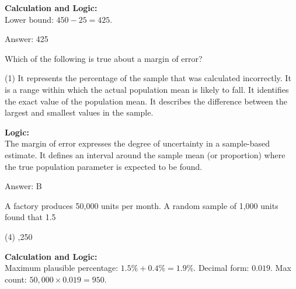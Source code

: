 \documentclass[11pt,paper=a4,answers]{exam}
\begin{document}
\begin{questions}
\begin{solution}
\textbf{Calculation and Logic:} \\
Lower bound: $450 - 25 = 425$.

\vspace{30pt}

Answer: \colorbox{yellow!100}{425}
\end{solution}

\vspace{60pt}

\question
Which of the following is true about a margin of error?
\begin{tasks}(1)
    \task It represents the percentage of the sample that was calculated incorrectly.
    \task It is a range within which the actual population mean is likely to fall.
    \task It identifies the exact value of the population mean.
    \task It describes the difference between the largest and smallest values in the sample.
\end{tasks}

\begin{solution}
\textbf{Logic:} \\
The margin of error expresses the degree of uncertainty in a sample-based estimate. It defines an interval around the sample mean (or proportion) where the true population parameter is expected to be found. 

\vspace{30pt}

Answer: \colorbox{yellow!100}{B}
\end{solution}

\vspace{60pt}

\question
A factory produces 50,000 units per month. A random sample of 1,000 units found that 1.5%
\begin{tasks}(4)
    ,250
\end{tasks}

\begin{solution}
\textbf{Calculation and Logic:} \\
Maximum plausible percentage: $1.5\% + 0.4\% = 1.9\%$. Decimal form: $0.019$. Max count: $50,000 \times 0.019 = 950$.


\end{solution}
\end{questions}
\end{document}

